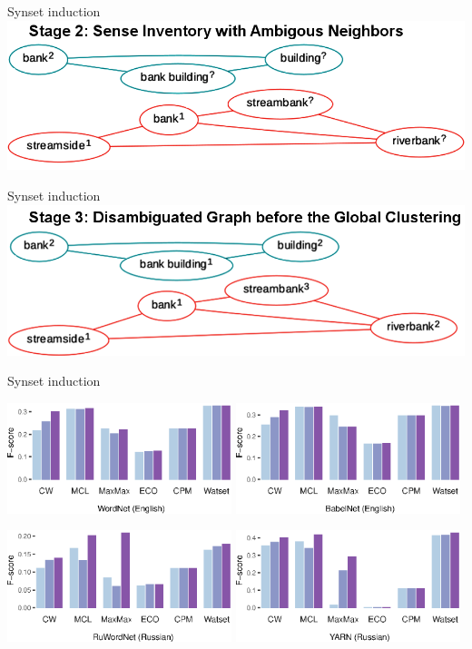 \begin{frame}{Synset induction}
\centering\includegraphics[width=1\textwidth]{stages2}	
\end{frame}



\begin{frame}{Synset induction}
\centering\includegraphics[width=1\textwidth]{stages3}	
\end{frame}


\begin{frame}{Synset induction}

  \includegraphics[width=0.49\textwidth]{edges-en-wordnet}  
  \includegraphics[width=0.49\textwidth]{edges-en-babelnet}

  \pause    
  \includegraphics[width=0.49\textwidth]{edges-ru-rwn}     
  \includegraphics[width=0.49\textwidth]{edges-ru-yarn}     
	
\end{frame}



